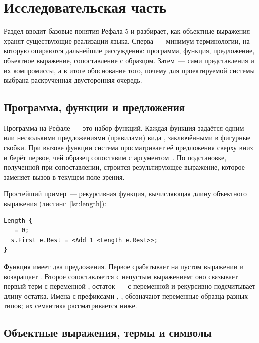 \section{Исследовательская часть}
\label{sec:research}

Раздел вводит базовые понятия Рефала-5 и разбирает, как объектные выражения хранят
существующие реализации языка. Сперва~--- минимум терминологии, на которую опираются
дальнейшие рассуждения: программа, функция, предложение, объектное выражение,
сопоставление с образцом. Затем~--- сами представления и их компромиссы, а в итоге
обоснование того, почему для проектируемой системы выбрана раскрученная двусторонняя
очередь.

\subsection{Программа, функции и предложения}
\label{sec:refal-program}

Программа на Рефале~--- это набор функций. Каждая функция задаётся одним или
несколькими предложениями (правилами) вида ,
заключёнными в фигурные скобки. При вызове функции система просматривает её
предложения сверху вниз и берёт первое, чей образец сопоставим с
аргументом~\mbox{\cite{refal_book,refal05_site}}. По подстановке, полученной при
сопоставлении, строится результирующее выражение, которое заменяет вызов в
текущем поле зрения.

Простейший пример~--- рекурсивная функция, вычисляющая длину объектного
выражения (листинг~\ref{lst:length}):

\begin{lstlisting}[language=Refal,caption={Функция подсчёта длины выражения},label={lst:length}]
Length {
   = 0;
  s.First e.Rest = <Add 1 <Length e.Rest>>;
}
\end{lstlisting}

Функция  имеет два предложения. Первое срабатывает на пустом
выражении и возвращает . Второе сопоставляется с непустым выражением:
оно связывает первый терм с переменной , остаток~--- с
переменной  и рекурсивно подсчитывает длину остатка.
Имена с префиксами , ,  обозначают переменные
образца разных типов; их семантика рассматривается ниже.

\subsection{Объектные выражения, термы и символы}

